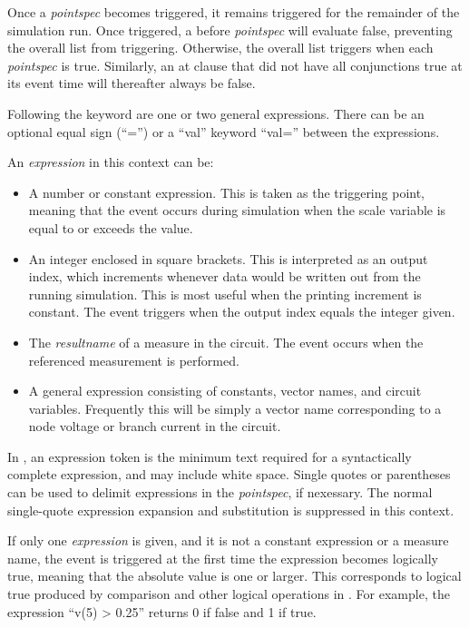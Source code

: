 Once a {\it pointspec} becomes triggered, it remains triggered for the
remainder of the simulation run.  Once triggered, a {\vt before} {\it
pointspec} will evaluate false, preventing the overall list from
triggering.  Otherwise, the overall list triggers when each {\it
pointspec} is true.  Similarly, an {\vt at} clause that did not have
all conjunctions true at its event time will thereafter always be
false.

Following the keyword are one or two general expressions.  There can
be an optional equal sign (``{\vt =}'') or a ``{\vt val}'' keyword
``{\vt val=}'' between the expressions.

An {\it expression} in this context can be:
\begin{itemize}
\item{A number or constant expression.  This is taken as the
triggering point, meaning that the event occurs during simulation when
the scale variable is equal to or exceeds the value.}

\item{An integer enclosed in square brackets.  This is interpreted as
an output index, which increments whenever data would be written out
from the running simulation.  This is most useful when the printing
increment is constant.  The event triggers when the output index
equals the integer given.}

\item{The {\it resultname} of a measure in the circuit.  The event
occurs when the referenced measurement is performed.}

\item{A general expression consisting of constants, vector names, and
circuit variables.  Frequently this will be simply a vector name
corresponding to a node voltage or branch current in the circuit.}
\end{itemize}

In {\WRspice}, an expression token is the minimum text required for a
syntactically complete expression, and may include white space. 
Single quotes or parentheses can be used to delimit expressions in the
{\it pointspec}, if nexessary.  The normal single-quote expression
expansion and substitution is suppressed in this context.

If only one {\it expression} is given, and it is not a constant
expression or a measure name, the event is triggered at the first time
the expression becomes logically true, meaning that the absolute value
is one or larger.  This corresponds to logical true produced by
comparison and other logical operations in {\WRspice}.  For example,
the expression ``{\vt v(5) > 0.25}'' returns 0 if false and 1 if true.

